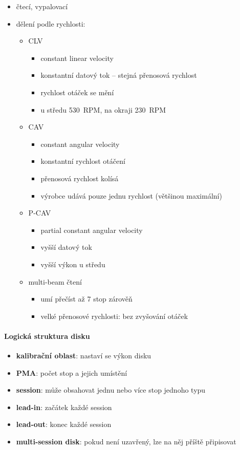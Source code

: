 \documentclass[a4paper,12pt]{article}
\providecommand{\tightlist}{%
\setlength{\itemsep}{0pt}\setlength{\parskip}{0pt}}
\begin{document}
\begin{itemize}
  \tightlist
  \item čtecí, vypalovací
  \item dělení podle rychlosti:
  \begin{itemize}
    \tightlist
    \item CLV
    \begin{itemize}
      \tightlist
      \item constant linear velocity
      \item konstantní datový tok -- stejná přenosová rychlost
      \item rychlost otáček se mění
      \item u středu 530~RPM, na okraji 230~RPM
    \end{itemize}
    \item CAV
    \begin{itemize}
      \tightlist
      \item constant angular velocity
      \item konstantní rychlost otáčení
      \item přenosová rychlost kolísá
      \item výrobce udává pouze jednu rychlost (většinou maximální)
    \end{itemize}
    \item P-CAV
    \begin{itemize}
      \tightlist
      \item partial constant angular velocity
      \item vyšší datový tok
      \item vyšší výkon u středu
    \end{itemize}
    \item multi-beam čtení
    \begin{itemize}
      \tightlist
      \item umí přečíst až 7 stop zárověň
      \item velké přenosové rychlosti: bez zvyšování otáček
    \end{itemize}
  \end{itemize}
\end{itemize}

\paragraph{Logická struktura disku}

\begin{itemize}
  \tightlist
  \item \textbf{kalibrační oblast}: nastaví se výkon disku
  \item \textbf{PMA}: počet stop a jejich umístění
  \item \textbf{session}: může obsahovat jednu nebo více stop jednoho typu
  \item \textbf{lead-in}: začátek každé session
  \item \textbf{lead-out}: konec každé session
  \item \textbf{multi-session disk}: pokud není uzavřený, lze na něj příště
  připisovat
\end{itemize}
\end{document}
